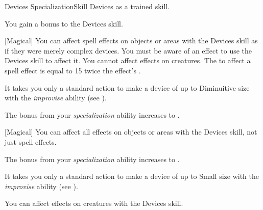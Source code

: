     \begin{feat}{Devices Specialization}{Skill}
        \featpre Devices as a trained skill.

         You gain a  bonus to the Devices skill.

        [Magical] You can affect spell effects on objects or areas with the Devices skill as if they were merely complex devices.
        You must be aware of an effect to use the Devices skill to affect it.
        You cannot affect effects on creatures.
        The  to affect a spell effect is equal to 15 \add twice the effect's .

         It takes you only a standard action to make a device of up to Diminuitive size with the \textit{improvise} ability (see ).

         The bonus from your \textit{specialization} ability increases to .
        
        [Magical] You can affect all  effects on objects or areas with the Devices skill, not just spell effects.

         The bonus from your \textit{specialization} ability increases to .

         It takes you only a standard action to make a device of up to Small size with the \textit{improvise} ability (see ).

         You can affect  effects on creatures with the Devices skill.
    \end{feat}

